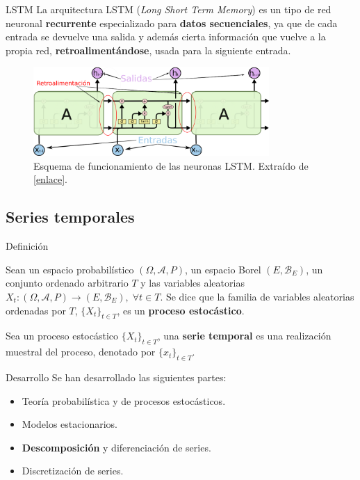 \documentclass[spanish]{beamer}
\begin{document}
\begin{frame}{LSTM}
  La arquitectura LSTM (\emph{Long Short Term Memory}) es un tipo de red neuronal \textbf{recurrente} especializado para \textbf{datos secuenciales}, ya que de cada entrada se devuelve una salida y además cierta información que vuelve a la propia red, \textbf{retroalimentándose}, usada para la siguiente entrada.

  \begin{figure}
    \centering
    \includegraphics[width=0.8\textwidth]{img/lstm-cells}
    \caption{Esquema de funcionamiento de las neuronas LSTM. Extraído de \href{https://colah.github.io/posts/2015-08-Understanding-LSTMs/}{[enlace]}.}
  \end{figure}
\end{frame}

\subsection{Series temporales}

\begin{frame}{Definición}
  \begin{definition}
    Sean un espacio probabilístico $(\Omega, \mathcal{A}, P)$, un espacio Borel $(E, \mathcal{B}_E)$, un conjunto ordenado arbitrario $T$ y las variables aleatorias $X_t : (\Omega, \mathcal{A}, P) \to (E, \mathcal{B}_E), \; \forall t \in T$. Se dice que la familia de variables aleatorias ordenadas por $T$, $\{X_t\}_{t \in T}$, es un \textbf{proceso estocástico}.
  \end{definition}

  \pause

  \begin{definition}
    Sea un proceso estocástico $\{X_t\}_{t \in T}$, una \textbf{serie temporal} es una realización muestral del proceso, denotado por $\{x_t\}_{t \in T}$.
  \end{definition}
\end{frame}

\begin{frame}{Desarrollo}
  Se han desarrollado las siguientes partes:
  \begin{itemize}
    \item Teoría probabilística y de procesos estocásticos.
    \item Modelos estacionarios.
    \item \textbf{Descomposición} y diferenciación de series.
    \item Discretización de series.
  \end{itemize}
\end{frame}
\end{document}
